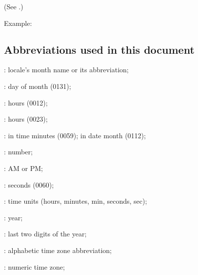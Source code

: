 \documentclass[letterpaper,10pt,english]{sphinxmanual}
\begin{document}
\sphinxAtStartPar
(See {\hyperref[\detokenize{basic/date_format:abbreviation}]{}}.)

\sphinxAtStartPar
Example:

\begin{sphinxVerbatim}[commandchars=\\\{\}]
          
  
\end{sphinxVerbatim}


\subsection{Abbreviations used in this document}
\label{\detokenize{basic/date_format:abbreviations-used-in-this-document}}\label{\detokenize{basic/date_format:abbreviation}}
\begin{DUlineblock}{0em}
\item[]   : locale’s month name or its abbreviation;
\item[]    : day of month (01\sphinxhyphen{}31);
\item[]    : hours (00\sphinxhyphen{}12);
\item[]    : hours (00\sphinxhyphen{}23);
\item[]    : in time \sphinxhyphen{} minutes (00\sphinxhyphen{}59); in date \sphinxhyphen{} month (01\sphinxhyphen{}12);
\item[]     : number;
\item[]    : AM or PM;
\item[]    : seconds  (00\sphinxhyphen{}60);
\item[]    : time units (hours, minutes, min, seconds, sec);
\item[]  : year;
\item[]    : last two digits of the year;
\item[]     : alphabetic time zone abbreviation;
\item[]     : numeric time zone;
\end{DUlineblock}
\end{document}
